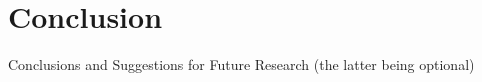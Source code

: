 \chapter{Conclusion}
\label{ch:conclusion}

Conclusions and Suggestions for Future Research (the latter being optional)